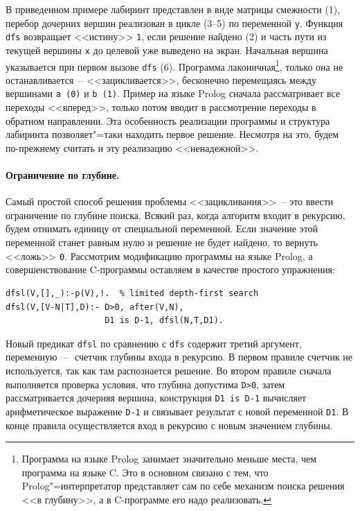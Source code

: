 \documentclass[a4paper,14pt, openany, twoside, draft]{extbook} %
\begin{document}
В приведенном примере лабиринт представлен в виде матрицы смежности (1), перебор дочерних вершин реализован в цикле (3--5) по переменной \texttt{y}.  Функция \texttt{dfs} возвращает <<истину>> \texttt{1}, если решение найдено (2) и часть пути из текущей вершины \texttt{x} до целевой уже выведено на экран.  Начальная вершина указывается при первом вызове \texttt{dfs} (6).  Программа лаконичная\footnote{Программа на языке Prolog занимает значительно меньше места, чем программа на языке C.  Это в основном связано с тем, что Prolog"=интерпретатор представляет сам по себе механизм поиска решения <<в глубину>>, а в C-программе его надо реализовать.}, только она не останавливается~-- <<зацикливается>>, бесконечно перемещаясь между вершинами \texttt{a~(0)} и \texttt{b~(1)}.  Пример на языке \foreignlanguage{english}{Prolog} сначала рассматривает все переходы <<вперед>>, только потом вводит в рассмотрение переходы в обратном направлении.  Эта особенность реализации программы и структура лабиринта позволяет"=таки находить первое решение.  Несмотря на это, будем по-прежнему считать и эту реализацию <<ненадежной>>.

\paragraph{Ограничение по глубине.} Самый простой способ решения проблемы <<зацикливания>>~-- это ввести ограничение по глубине поиска.  Всякий раз, когда алгоритм входит в рекурсию, будем отнимать единицу от специальной переменной.  Если значение этой переменной станет равным нулю и решение не будет найдено, то вернуть <<ложь>> \texttt{0}.  Рассмотрим модификацию программы на языке Prolog, а совершенствование C-программы оставляем в качестве простого упражнения:

\begin{verbatim}
dfsl(V,[],_):-p(V),!.  % limited depth-first search
dfsl(V,[V-N|T],D):- D>0, after(V,N),
                    D1 is D-1, dfsl(N,T,D1).
\end{verbatim}


Новый предикат \texttt{dfsl} по сравнению с \texttt{dfs} содержит третий аргумент, переменную\,~--~\,счетчик глубины входа в рекурсию.  В первом правиле счетчик не используется, так как там распознается решение.  Во втором правиле сначала выполняется проверка условия, что глубина допустима \texttt{D>0}, затем рассматривается дочерняя вершина, конструкция \texttt{D1 is D-1} вычисляет арифметическое выражение \texttt{D-1} и связывает результат с новой переменной \texttt{D1}.  В конце правила осуществляется вход в рекурсию с новым значением глубины.
\end{document}
